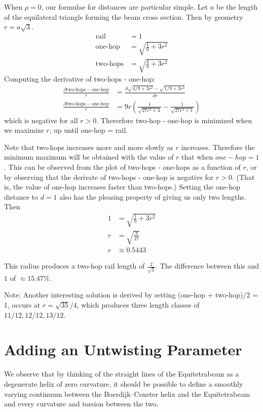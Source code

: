 \documentclass[11pt]{article}
\begin{document}
When $\rho = 0$, our formulae for distances are particular simple. Let $a$ be the length of the equilateral triangle
forming the beam cross section. Then by geometry $r = a \sqrt{3}$.
\begin{align*}
  \text{rail} &=  1 \\
  \text{one-hop} &= \sqrt{\frac{1}{9} + 3r^2}\\
\text{two-hops}    &= \sqrt{\frac{4}{9} + 3r^2}
\end{align*}
Computing the derivative of two-hops - one-hop:
\begin{align*}
 \frac{\partial \text{two-hops} - \text{one-hop}}{r} &= \frac{\partial \sqrt{4/9 + 3r^2} - \sqrt{1/9 + 3r^2}}{\partial r} \\
  \frac{\partial \text{two-hops} - \text{one-hop}}{r} &= 9r (\frac{1}{\sqrt{27r^2 + 4}} - \frac{1}{\sqrt{ 27r^2 + 1}}) 
\end{align*}
which is negative for all $r> 0$. Thererfore two-hop - one-hop
is minimized when we maximize $r$, up until one-hop = rail.

Note that two-hops increases more and more slowly as $r$ increases. Therefore the minimum maximum will
be obtained with the value of $r$ that when $one-hop = 1$. This can be observed from the
plot of two-hops - one-hops as a function of $r$, or by observing that the derivate of two-hops - one-hop
is negative for $r > 0$. (That is, the value of one-hop increases faster than two-hops.) 
Setting the one-hop distance to $d = 1$ also has the pleasing property of giving us only two lengths. Then
\begin{align*}
   1  &=  \sqrt{\frac{1}{9} + 3r^2} \\
   r  &= \sqrt{\frac{8}{27}} \\
   r &\approx 0.5443
\end{align*}

This radius produces a two-hop rail length of
$\frac{2}{\sqrt{3}}$. The difference between this 
and $1$ of $\approx 15.47\% $.

Note: Another interesting solution is derived by setting (one-hop + two-hop)/2 = 1,  occurs at $r = \sqrt{35}/4$,
which produces three length classes of $11/12, 12/12, 13/12$.



\section{Adding an Untwisting Parameter}

We observe that by thinking of the straight lines of the
Equitetrabeam as a degenerate helix of zero curvature,
it should be possible to define a smoothly varying continuum between the Boerdijk--Coxeter helix and the Equitetrabeam and every
curvature and torsion between the two.
\end{document}
